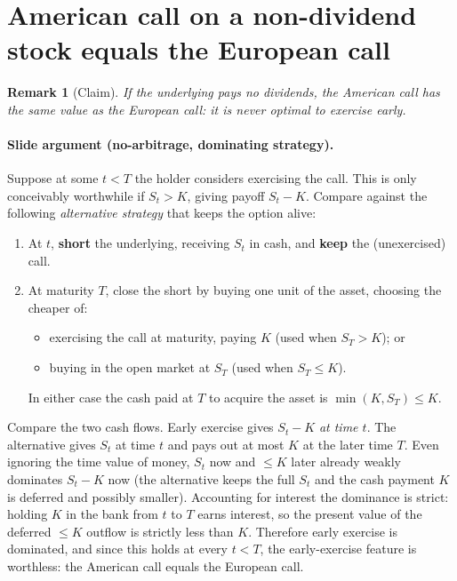 \documentclass[11pt]{article}
\newtheorem{remark}{Remark}
\begin{document}
\section{American call on a non-dividend stock equals the European call}\label{sec:callequiv}

\begin{remark}[Claim]
If the underlying pays no dividends, the American call has the same value as the European call: it is never
optimal to exercise early.
\end{remark}

\paragraph{Slide argument (no-arbitrage, dominating strategy).} Suppose at some $t<T$ the holder considers
exercising the call. This is only conceivably worthwhile if $S_t>K$, giving payoff $S_t-K$. Compare against the
following \emph{alternative strategy} that keeps the option alive:
\begin{enumerate}[leftmargin=*]
  \item At $t$, \textbf{short} the underlying, receiving $S_t$ in cash, and \textbf{keep} the (unexercised)
  call.
  \item At maturity $T$, close the short by buying one unit of the asset, choosing the cheaper of:
  \begin{itemize}
    \item exercising the call at maturity, paying $K$ (used when $S_T>K$); or
    \item buying in the open market at $S_T$ (used when $S_T\le K$).
  \end{itemize}
  In either case the cash paid at $T$ to acquire the asset is $\min(K,S_T)\le K$.
\end{enumerate}
Compare the two cash flows. Early exercise gives $S_t-K$ \emph{at time $t$}. The alternative gives $S_t$ at
time $t$ and pays out at most $K$ at the later time $T$. Even ignoring the time value of money, $S_t$ now and
$\le K$ later already weakly dominates $S_t-K$ now (the alternative keeps the full $S_t$ and the cash payment
$K$ is deferred and possibly smaller). Accounting for interest the dominance is strict: holding $K$ in the bank
from $t$ to $T$ earns interest, so the present value of the deferred $\le K$ outflow is strictly less than $K$.
Therefore early exercise is dominated, and since this holds at every $t<T$, the early-exercise feature is
worthless: the American call equals the European call.
\end{document}

